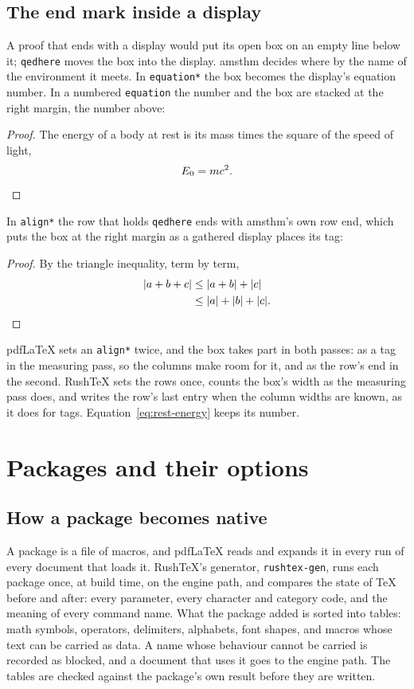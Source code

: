 \documentclass{article}
\numberwithin{equation}{section}
\theoremstyle{definition}
\theoremstyle{remark}
\begin{document}
\subsection{The end mark inside a display}
A proof that ends with a display would put its open box on an empty line below it;
\texttt{qedhere} moves the box into the display. amsthm decides where by the name of the
environment it meets. In \texttt{equation*} the box becomes the display's equation
number. In a numbered \texttt{equation} the number and the box are stacked at the
right margin, the number above:
\begin{proof}
The energy of a body at rest is its mass times the square of the speed of light,
\begin{equation}
  E_0 = m c^{2} . \label{eq:rest-energy} \qedhere
\end{equation}
\end{proof}
In \texttt{align*} the row that holds \texttt{qedhere} ends with amsthm's own row end,
which puts the box at the right margin as a gathered display places its tag:
\begin{proof}
By the triangle inequality, term by term,
\begin{align*}
  \lvert a + b + c \rvert &\le \lvert a + b \rvert + \lvert c \rvert \\
  &\le \lvert a \rvert + \lvert b \rvert + \lvert c \rvert . \qedhere
\end{align*}
\end{proof}
pdfLaTeX sets an \texttt{align*} twice, and the box takes part in both passes: as a tag
in the measuring pass, so the columns make room for it, and as the row's end in the
second. RushTeX sets the rows once, counts the box's width as the measuring pass does,
and writes the row's last entry when the column widths are known, as it does for tags.
Equation~\eqref{eq:rest-energy} keeps its number.

\section{Packages and their options}\label{sec:packages}

\subsection{How a package becomes native}

A package is a file of macros, and pdfLaTeX reads and expands it in every run of every
document that loads it. RushTeX's generator, \texttt{rushtex-gen}, runs each package
once, at build time, on the engine path, and compares the state of \TeX{} before and
after: every parameter, every character and category code, and the meaning of every
command name. What the package added is sorted into tables: math symbols, operators,
delimiters, alphabets, font shapes, and macros whose text can be carried as data. A
name whose behaviour cannot be carried is recorded as blocked, and a document that uses
it goes to the engine path. The tables are checked against the package's own result
before they are written.
\end{document}
